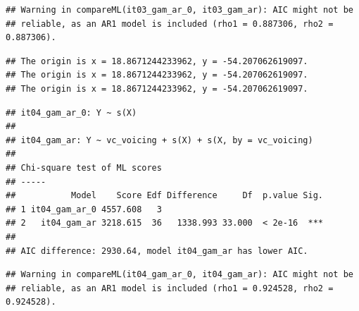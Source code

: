 \documentclass[12pt,]{article}
\begin{document}
\begin{verbatim}
## Warning in compareML(it03_gam_ar_0, it03_gam_ar): AIC might not be
## reliable, as an AR1 model is included (rho1 = 0.887306, rho2 = 0.887306).
\end{verbatim}

\begin{verbatim}
## The origin is x = 18.8671244233962, y = -54.207062619097.
## The origin is x = 18.8671244233962, y = -54.207062619097.
## The origin is x = 18.8671244233962, y = -54.207062619097.
\end{verbatim}

\begin{verbatim}
## it04_gam_ar_0: Y ~ s(X)
## 
## it04_gam_ar: Y ~ vc_voicing + s(X) + s(X, by = vc_voicing)
## 
## Chi-square test of ML scores
## -----
##           Model    Score Edf Difference     Df  p.value Sig.
## 1 it04_gam_ar_0 4557.608   3                                
## 2   it04_gam_ar 3218.615  36   1338.993 33.000  < 2e-16  ***
## 
## AIC difference: 2930.64, model it04_gam_ar has lower AIC.
\end{verbatim}

\begin{verbatim}
## Warning in compareML(it04_gam_ar_0, it04_gam_ar): AIC might not be
## reliable, as an AR1 model is included (rho1 = 0.924528, rho2 = 0.924528).
\end{verbatim}


\end{document}
